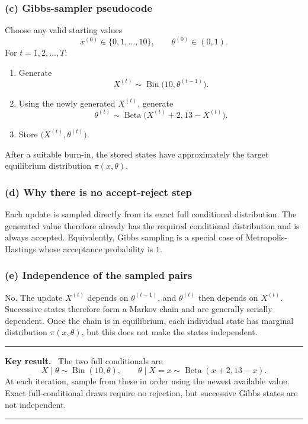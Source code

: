 \documentclass[11pt,a4paper]{article}
\newcommand{\given}{\mathrel{|}}
\newenvironment{keyresult}
  {\begin{center}\begin{minipage}{0.92\linewidth}\color{statblue}%
   \hrule\vspace{6pt}\textbf{Key result.}\ }
  {\vspace{6pt}\hrule\end{minipage}\end{center}}
\begin{document}
\subsubsection*{(c) Gibbs-sampler pseudocode}

Choose any valid starting values
\[
  x^{(0)}\in\{0,1,\ldots,10\},
  \qquad
  \theta^{(0)}\in(0,1).
\]
For $t=1,2,\ldots,T$:
\begin{enumerate}[label=\arabic*.,leftmargin=*]
  \item Generate
        \[
          X^{(t)}
          \sim\operatorname{Bin}\bigl(10,\theta^{(t-1)}\bigr).
        \]
  \item Using the newly generated $X^{(t)}$, generate
        \[
          \theta^{(t)}
          \sim\operatorname{Beta}\bigl(X^{(t)}+2,13-X^{(t)}\bigr).
        \]
  \item Store $\bigl(X^{(t)},\theta^{(t)}\bigr)$.
\end{enumerate}
After a suitable burn-in, the stored states have approximately the target
equilibrium distribution $\pi(x,\theta)$.

\subsubsection*{(d) Why there is no accept-reject step}

Each update is sampled directly from its exact full conditional distribution.
The generated value therefore already has the required conditional distribution and is
always accepted. Equivalently, Gibbs sampling is a special case of
Metropolis-Hastings whose acceptance probability is $1$.

\subsubsection*{(e) Independence of the sampled pairs}

No. The update $X^{(t)}$ depends on $\theta^{(t-1)}$, and
$\theta^{(t)}$ then depends on $X^{(t)}$. Successive states therefore form a
Markov chain and are generally serially dependent. Once the chain is in
equilibrium, each individual state has marginal distribution $\pi(x,\theta)$,
but this does not make the states independent.

\begin{keyresult}
The two full conditionals are
\[
  \boxed{
    X\given\theta\sim\operatorname{Bin}(10,\theta),
    \qquad
    \theta\given X=x\sim\operatorname{Beta}(x+2,13-x)
  }.
\]
At each iteration, sample from these in order using the newest available
value. Exact full-conditional draws require no rejection, but successive Gibbs
states are not independent.
\end{keyresult}
\end{document}
